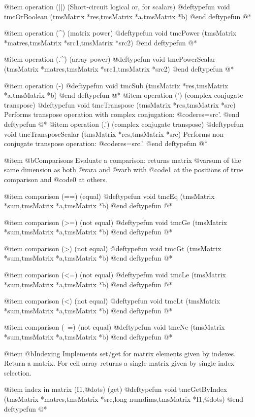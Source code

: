 @item  operation (||) (Short-circuit  logical or, for scalars)
@deftypefun void  tmcOrBoolean (tmsMatrix *res,tmsMatrix *a,tmsMatrix *b)
@end deftypefun
@*

@item  operation (^) (matrix power)
@deftypefun void tmcPower (tmsMatrix *matres,tmsMatrix *src1,tmsMatrix *src2)
@end deftypefun
@*

@item  operation (.^) (array power)
@deftypefun void tmcPowerScalar (tmsMatrix *matres,tmsMatrix *src1,tmsMatrix *src2)
@end deftypefun
@*



@item  operation (-)  
@deftypefun void  tmcSub (tmsMatrix *res,tmsMatrix *a,tmsMatrix *b) 
@end deftypefun
@*
@item  operation (')  (complex conjugate transpose)
@deftypefun void  tmcTranspose (tmsMatrix *res,tmsMatrix *src) 
Performs transpose operation with complex conjugation:  @code{res=src'}.
@end deftypefun
@*
@item  operation (.')  (complex conjugate transpose)
@deftypefun void  tmcTransposeScalar (tmsMatrix *res,tmsMatrix *src) 
Performs non-conjugate transpose operation:  @code{res=src.'}.
@end deftypefun
@*

@item @b{Comparisons}
Evaluate a comparison: returns matrix @var{sum} of the same dimension as both @var{a}
and @var{b} with @code{1} at the positions of true comparison and @code{0} at others.

@item  comparison (==)  (equal)
@deftypefun void  tmcEq (tmsMatrix *sum,tmsMatrix *a,tmsMatrix *b) 
@end deftypefun
@*

@item  comparison (>=)  (not equal)
@deftypefun void  tmcGe (tmsMatrix *sum,tmsMatrix *a,tmsMatrix *b)
@end deftypefun
@*

@item  comparison (>)  (not equal)
@deftypefun void  tmcGt (tmsMatrix *sum,tmsMatrix *a,tmsMatrix *b)
@end deftypefun
@*

@item  comparison (<=)  (not equal)
@deftypefun void  tmcLe (tmsMatrix *sum,tmsMatrix *a,tmsMatrix *b)
@end deftypefun
@*

@item  comparison (<)  (not equal)
@deftypefun void  tmcLt (tmsMatrix *sum,tmsMatrix *a,tmsMatrix *b)
@end deftypefun
@*

@item  comparison (~=)  (not equal)
@deftypefun void  tmcNe (tmsMatrix *sum,tmsMatrix *a,tmsMatrix *b)
@end deftypefun
@*

@item @b{Indexing}
Implements set/get for matrix elements given by indexes. Return a matrix.
For cell array returns a single matrix given by single index selection.

@item  index in matrix (I1,@dots{})   (get)
@deftypefun void tmcGetByIndex (tmsMatrix *matres,tmsMatrix *src,long numdims,tmsMatrix *I1,@dots{})
@end deftypefun
@*

